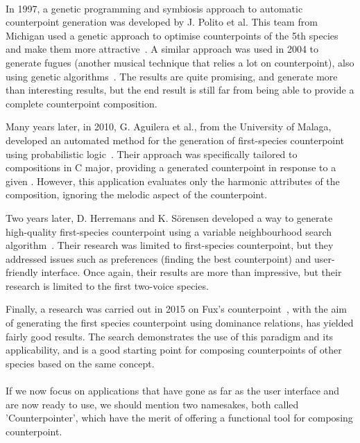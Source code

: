 \paragraph{}
In 1997, a genetic programming and symbiosis approach to automatic counterpoint generation was developed by J. Polito et al. This team from Michigan used a genetic approach to optimise counterpoints of the 5th species and make them more attractive~\cite{polito1997musica}. A similar approach was used in 2004 to generate fugues (another musical technique that relies a lot on counterpoint), also using genetic algorithms~\cite{garay2004fugue}. The results are quite promising, and generate more than interesting results, but the end result is still far from being able to provide a complete counterpoint composition.

Many years later, in 2010, G. Aguilera et al., from the University of Malaga, developed an automated method for the generation of first-species counterpoint using probabilistic logic~\cite{Aguilera2010}. Their approach was specifically tailored to compositions in C major, providing a generated counterpoint in response to a given \cf. However, this application evaluates only the harmonic attributes of the composition, ignoring the melodic aspect of the counterpoint.

Two years later, D. Herremans and K. Sörensen developed a way to generate high-quality first-species counterpoint using a variable neighbourhood search algorithm~\cite{Herremans2012}. Their research was limited to first-species counterpoint, but they addressed issues such as preferences (finding the best counterpoint) and user-friendly interface. Once again, their results are more than impressive, but their research is limited to the first two-voice species.

Finally, a research was carried out in 2015 on Fux's counterpoint~\cite{komosinski2015automatic}, with the aim of generating the first species counterpoint using dominance relations, has yielded fairly good results. The search demonstrates the use of this paradigm and its applicability, and is a good starting point for composing counterpoints of other species based on the same concept.

\paragraph{}
If we now focus on applications that have gone as far as the user interface and are now ready to use, we should mention two namesakes, both called 'Counterpointer', which have the merit of offering a functional tool for composing counterpoint.

